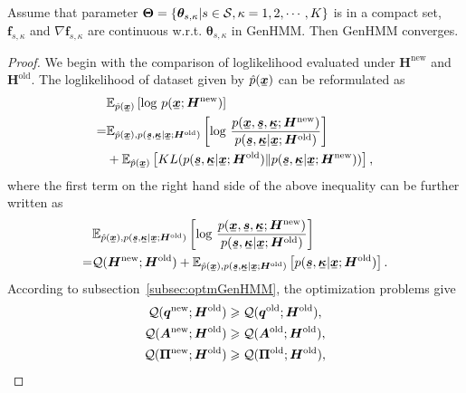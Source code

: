 \documentclass[letterpaper]{article} %
\newcommand{\ubar}[1]{\mkern2mu\underline{\mkern-2mu #1\mkern-2mu}\mkern2mu}
\newcommand{\ubm}[1]{\ubar{\bm{#1}}}
\begin{document}
\begin{prop}\label{proposition1}
  Assume that parameter $\bm{\Theta} = \left\{ \bm{\theta}_{s,\kappa}| s\in \mathcal{S}, \kappa=1, 2, \cdots, K \right\}$ is in a compact set,  $\bm{f}_{s,\kappa}$ and  ${\nabla\bm{f}_{s,\kappa}}$ are continuous w.r.t. ${\bm\theta}_{s,\kappa}$ in GenHMM. Then GenHMM converges.
\end{prop}

\begin{proof}
  We begin with the comparison of loglikelihood evaluated under $\bm{H}^{\mathrm{new}}$ and $\bm{H}^{\mathrm{old}}$. The loglikelihood of dataset given by $\hat{p}(\ubm{x})$ can be reformulated as
  \begin{align*}
    &\EE_{\hat{p}(\ubm{x})}\left[ \log\,p(\ubm{x};\bm{H}^{\mathrm{new}}) \right] \nonumber \\
    =& \EE_{\hat{p}(\ubm{x}),p(\ubm{s},\ubm{\kappa}| \ubm{x}; \bm{H}^{\mathrm{old}})}\left[ \log\,\frac{p(\ubm{x}, \ubm{s}, \ubm{\kappa}; \bm{H}^{\mathrm{new}})}{p(\ubm{s}, \ubm{\kappa}|\ubm{x}; \bm{H}^{\mathrm{old}})}\right] \nonumber \\
    &+ \EE_{\hat{p}(\ubm{x})}\left[ KL(p(\ubm{s}, \ubm{\kappa}|\ubm{x}; \bm{H}^{\mathrm{old}})\|p(\ubm{s}, \ubm{\kappa}|\ubm{x}; \bm{H}^{\mathrm{new}})) \right],
  \end{align*}
  where the first term on the right hand side of the above inequality can be further written as
  \begin{align*}
    &\EE_{\hat{p}(\ubm{x}),p(\ubm{s},\ubm{\kappa}| \ubm{x}; \bm{H}^{\mathrm{old}})}\left[ \log\,\frac{p(\ubm{x}, \ubm{s}, \ubm{\kappa}; \bm{H}^{\mathrm{new}})}{p(\ubm{s}, \ubm{\kappa}|\ubm{x}; \bm{H}^{\mathrm{old}})}\right] \nonumber \\
    = &\Qq(\bm{H}^{\mathrm{new}}; \bm{H}^{\mathrm{old}}) + \EE_{\hat{p}(\ubm{x}),p(\ubm{s},\ubm{\kappa}| \ubm{x}; \bm{H}^{\mathrm{old}})}\left[p(\ubm{s}, \ubm{\kappa}|\ubm{x}; \bm{H}^{\mathrm{old}})\right].
  \end{align*}
  According to subsection~\ref{subsec:optmGenHMM}, the optimization problems give
  \begin{align*}
    \Qq(\bm{q}^{\mathrm{new}}; \bm{H}^{\mathrm{old}}) &\geq \Qq(\bm{q}^{\mathrm{old}}; \bm{H}^{\mathrm{old}}),\nonumber \\
    \Qq(\bm{A}^{\mathrm{new}}; \bm{H}^{\mathrm{old}}) &\geq \Qq(\bm{A}^{\mathrm{old}}; \bm{H}^{\mathrm{old}}),\nonumber \\
    \Qq(\bm{\Pi}^{\mathrm{new}}; \bm{H}^{\mathrm{old}}) &\geq \Qq(\bm{\Pi}^{\mathrm{old}}; \bm{H}^{\mathrm{old}}), \nonumber \\

\end{align*}
\end{proof}
\end{document}
